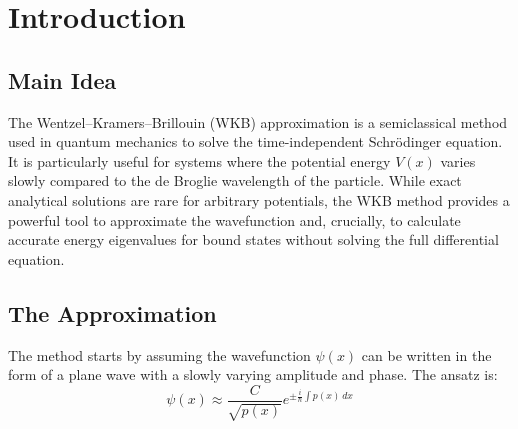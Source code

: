 \documentclass[12pt, a4paper, twoside]{article}
\begin{document}
    \begin{abstract}
        This report presents the numerical application of the semiclassical Wentzel-Kramers-Brillouin (WKB) approximation to solve the time-independent Schrödinger equation for various one-dimensional potentials. A generalized Fortran 90 solver was developed using the Bohr-Sommerfeld quantization condition and the Bisection root-finding method. The solver was tested against eleven distinct potentials, including harmonic, infinite well, and anharmonic systems. The numerical results show excellent agreement with exact analytical values for the Harmonic Oscillator ($>99.99\%$ accuracy) and the Infinite Square Well, validating the solver's robustness. For anharmonic potentials where exact solutions are not available, the results exhibit the expected physical scaling behavior.
    \end{abstract}
    
    \thispagestyle{empty}
    \newpage

  	\tableofcontents
	\thispagestyle{empty}
	
	\clearpage

    \section{Introduction}

        \subsection{Main Idea}
        The Wentzel–Kramers–Brillouin (WKB) approximation is a semiclassical method used in quantum mechanics to solve the time-independent Schrödinger equation. It is particularly useful for systems where the potential energy $V(x)$ varies slowly compared to the de Broglie wavelength of the particle. While exact analytical solutions are rare for arbitrary potentials, the WKB method provides a powerful tool to approximate the wavefunction and, crucially, to calculate accurate energy eigenvalues for bound states without solving the full differential equation.

        \subsection{The Approximation}
        The method starts by assuming the wavefunction $\psi(x)$ can be written in the form of a plane wave with a slowly varying amplitude and phase. The ansatz is: 
        $$\boxed{\psi(x) \approx {\frac{C}{\sqrt{p(x)} } e^{ \pm \frac{i}{\hbar} \int p(x) \, dx} }}$$
\end{document}
